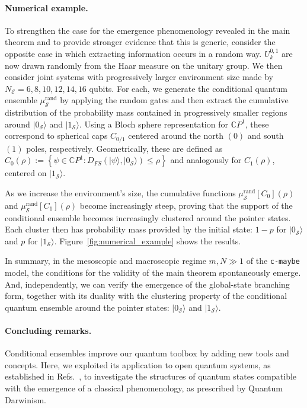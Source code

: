 \documentclass[a4paper,11pt,accepted=2024-09-14]{quantumarticle}
\newcommand{\ket}[1]    {| #1 \rangle}
\newcommand{\+}         {\dagger}
\newcommand{\mc}[1]{\mathcal{#1}}
\begin{document}
\paragraph{Numerical example.} 
To strengthen the case for the emergence phenomenology revealed in the main theorem and to provide stronger evidence that this is generic, consider the opposite case in which extracting information occurs in a random way. $U_k^{0,1}$ are now drawn randomly from the Haar measure on the unitary group. We then consider joint systems with progressively larger environment size made by $N_{\mc{E}} = 6,8,10,12,14,16$ qubits. For each, we generate the {conditional quantum ensemble} $\mu_{\mc{S}}^{\mathrm{rand}}$ by applying the random gates and then extract the cumulative distribution of the probability mass contained in progressively smaller regions around $\ket{0_{\mc{S}}}$ and $\ket{1_{\mc{S}}}$. Using a Bloch sphere representation for $\mathbb{C}P^1$, these correspond to spherical caps $C_{0/1}$ centered around the north $(0)$ and south $(1)$ poles, respectively. Geometrically, these are defined as $C_0(\rho) := \left\{\psi \in \mathbb{C}P^1 : D_{FS}(\ket{\psi},\ket{0_{\mc{S}}})\leq \rho\right\}$ and analogously for $C_1(\rho)$, centered on $\ket{1_{\mc{S}}}$.

As we increase the environment's size, the cumulative functions $\mu_{\mc{S}}^{\mathrm{rand}}[C_0](\rho)$ and $\mu_{\mc{S}}^{\mathrm{rand}}[C_1](\rho)$ become increasingly steep, proving that the support of the {conditional ensemble} becomes increasingly clustered around the pointer states. Each cluster then has probability mass provided by the initial state: $1-p$ for $\ket{0_{\mc{S}}}$ and $p$ for $\ket{1_{\mc{S}}}$. Figure~\ref{fig:numerical_example} shows the results.

In summary, in the mesoscopic and macroscopic regime $m,N\gg 1$ of the {\tt c-maybe} model, the conditions for the validity of the main theorem spontaneously emerge. And, independently, we can verify the emergence of the global-state branching form, together with its duality with the clustering property of the {conditional quantum ensemble} around the pointer states: $|0_{\mc{S}} \rangle$ and $|1_{\mc{S}} \rangle$. 

\paragraph{Concluding remarks.}
{Conditional ensembles improve} our quantum toolbox by adding new tools and concepts. Here, we exploited its application to open quantum systems, as established in Refs.~\cite{fabioGQ1,fabioGQ2}, to investigate the structures of quantum states compatible with the emergence of a classical phenomenology, as prescribed by Quantum Darwinism.
\end{document}
